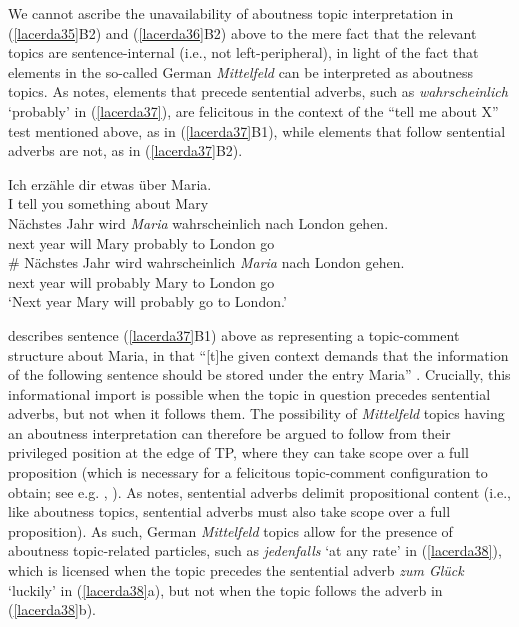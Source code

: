 \documentclass[output=paper]{langscibook}
\begin{document}
\begin{sloppypar}
We cannot ascribe the unavailability of aboutness topic interpretation in (\ref{lacerda35}B2) and (\ref{lacerda36}B2) above to the mere fact that the relevant topics are sentence-internal (i.e., not left-peripheral), in light of the fact that elements in the so-called German \emph{Mittelfeld} can be interpreted as aboutness topics. As \citet{Frey2004} notes, elements that precede sentential adverbs, such as \emph{wahrscheinlich} ‘probably’ in (\ref{lacerda37}), are felicitous in the context of the “tell me about X” test mentioned above, as in (\ref{lacerda37}B1), while elements that follow sentential adverbs are not, as in (\ref{lacerda37}B2).
\end{sloppypar}

\begin{exe}
\ex \label{lacerda37}
\begin{xlist}
 \label{lacerda37A}
\gll Ich 	erzähle 	dir 	etwas 	über 	Maria.\\
I 	tell 	you 	something 	about 	Mary\\
 \label{lacerda37B1}
\gll Nächstes 	Jahr 	wird 	\emph{Maria} 	wahrscheinlich 	nach 	London 	gehen.\\
next 	year 	will 	Mary 	probably 	to 	London 	go\\

 \label{lacerda37B2}
\gll \# Nächstes 	Jahr 	wird 	wahrscheinlich 	\emph{Maria} 	nach 	London 	gehen.\\
{} next 	year 	will 	probably 	Mary 	to 	London 	go\\
\glt‘Next year Mary will probably go to London.’\\
\citep[158]{Frey2004}
\end{xlist}
\end{exe}

\citet{Frey2004} describes sentence (\ref{lacerda37}B1) above as representing a topic-comment structure about Maria, in that “[t]he given context demands that the information of the following sentence should be stored under the entry Maria” \citep[158]{Frey2004}. Crucially, this informational import is possible when the topic in question precedes sentential adverbs, but not when it follows them. The possibility of \emph{Mittelfeld} topics having an aboutness interpretation can therefore be argued to follow from their privileged position at the edge of TP, where they can take scope over a full proposition (which is necessary for a felicitous topic-comment configuration to obtain; see e.g. \citealt{Reinhart1981}, \citealt{BianchiFrascarelli2010}). As \citet{Frey2003, Frey2004} notes, sentential adverbs delimit propositional content (i.e., like aboutness topics, sentential adverbs must also take scope over a full proposition). As such, German \emph{Mittelfeld} topics allow for the presence of aboutness topic-related particles, such as \emph{jedenfalls} ‘at any rate’ in (\ref{lacerda38}), which is licensed when the topic precedes the sentential adverb \emph{zum Glück} ‘luckily’ in (\ref{lacerda38}a), but not when the topic follows the adverb in (\ref{lacerda38}b).
\end{document}
